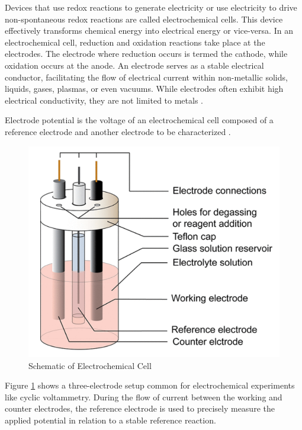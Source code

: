 Devices that use redox reactions to generate electricity or use electricity to drive non-spontaneous redox reactions are called electrochemical cells. This device effectively transforms chemical energy into electrical energy or vice-versa. In an electrochemical cell, reduction and oxidation reactions take place at the electrodes. The electrode where reduction occurs is termed the cathode, while oxidation occurs at the anode. An electrode serves as a stable electrical conductor, facilitating the flow of electrical current within non-metallic solids, liquids, gases, plasmas, or even vacuums. While electrodes often exhibit high electrical conductivity, they are not limited to metals \cite{Faraday_1970}.

Electrode potential is the voltage of an electrochemical cell composed of a reference electrode and another electrode to be characterized \cite{goldbook}.
\begin{figure}[h!]
  \centering
    \includegraphics[width=1.0\textwidth]{figures/cv_diagram.png}
    \caption{Schematic of Electrochemical Cell \cite{Elgrishi2018}}
    \label{cell_schematic}
\end{figure}
Figure \ref{cell_schematic} shows a three-electrode setup common for electrochemical experiments like cyclic voltammetry. During the flow of current between the working and counter electrodes, the reference electrode is used to precisely measure the applied potential in relation to a stable reference reaction.

